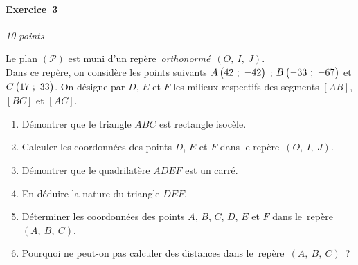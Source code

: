 \documentclass[a4paper,12pt,twocolumn,landscape]{article}
\newcommand{\rep}[3]{~$\left(#1,~#2,~#3\right)$}
\newcommand{\Fin}{node[xshift=-1.5ex,rotate=10]{F}
node[rotate=170]{i}
node[xshift=1.5ex,rotate=45]{n}}
\begin{document}
\vspace*{1em}

\begin{minipage}{0.45\textwidth}
\thispagestyle{firststyle}

\vspace*{1em}

%


\paragraph{Exercice~3} \hfill \emph{10 points}

Le plan $\left(\mathscr{P}\right)$ est muni d'un repère~\emph{orthonormé}\rep{O}{I}{J}.\\ Dans ce repère, on considère les points suivants $A\begin{pmatrix}42~;~-42\end{pmatrix}$ ; $B\begin{pmatrix}-33~;~-67\end{pmatrix}$ et $C\begin{pmatrix}17~;~33\end{pmatrix}$.
On désigne par $D$, $E$ et $F$ les milieux respectifs des segments $\left[AB\right]$,  $\left[BC\right]$ et $\left[AC\right]$.

\begin{enumerate}
	\item Démontrer que le triangle $ABC$ est rectangle isocèle.
	\item Calculer les coordonnées des points $D$, $E$ et $F$ dans le repère\rep{O}{I}{J}.
	\item Démontrer que le quadrilatère $ADEF$ est un carré.
	\item En déduire la nature du triangle $DEF$.
	\item Déterminer les coordonnées des points $A$, $B$, $C$, $D$, $E$ et $F$ dans le~repère\rep{A}{B}{C}.
	\item Pourquoi ne peut-on pas calculer des distances dans le~repère\rep{A}{B}{C}~?
\end{enumerate}

\vspace*{2em}

\centering
{}


\end{minipage}
\end{document}

